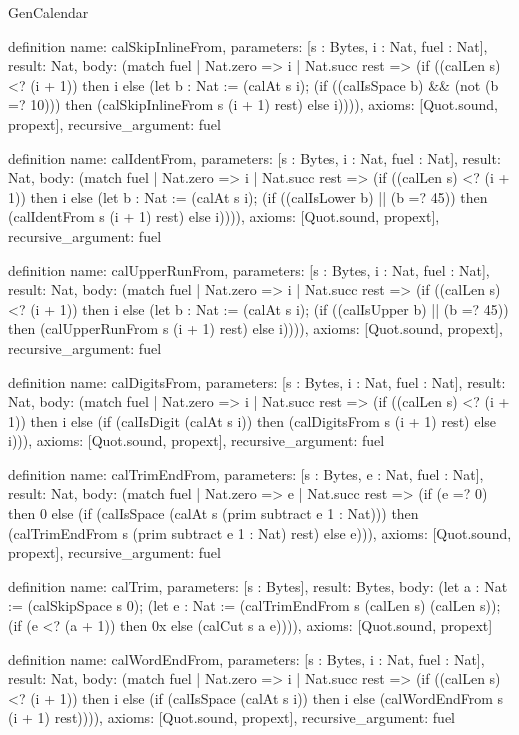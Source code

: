 \begin{lexlean}{GenCalendar}
\begin{semanticmodule}
definition{
  name: calSkipInlineFrom,
  parameters: [s : Bytes, i : Nat, fuel : Nat],
  result: Nat,
  body: (match fuel
    | Nat.zero => i
    | Nat.succ rest => (if ((calLen s) <? (i + 1)) then i else (let b : Nat := (calAt s i); (if ((calIsSpace b) && (not (b =? 10))) then (calSkipInlineFrom s (i + 1) rest) else i)))),
  axioms: [Quot.sound, propext],
  recursive_argument: fuel
}

definition{
  name: calIdentFrom,
  parameters: [s : Bytes, i : Nat, fuel : Nat],
  result: Nat,
  body: (match fuel
    | Nat.zero => i
    | Nat.succ rest => (if ((calLen s) <? (i + 1)) then i else (let b : Nat := (calAt s i); (if ((calIsLower b) || (b =? 45)) then (calIdentFrom s (i + 1) rest) else i)))),
  axioms: [Quot.sound, propext],
  recursive_argument: fuel
}

definition{
  name: calUpperRunFrom,
  parameters: [s : Bytes, i : Nat, fuel : Nat],
  result: Nat,
  body: (match fuel
    | Nat.zero => i
    | Nat.succ rest => (if ((calLen s) <? (i + 1)) then i else (let b : Nat := (calAt s i); (if ((calIsUpper b) || (b =? 45)) then (calUpperRunFrom s (i + 1) rest) else i)))),
  axioms: [Quot.sound, propext],
  recursive_argument: fuel
}

definition{
  name: calDigitsFrom,
  parameters: [s : Bytes, i : Nat, fuel : Nat],
  result: Nat,
  body: (match fuel
    | Nat.zero => i
    | Nat.succ rest => (if ((calLen s) <? (i + 1)) then i else (if (calIsDigit (calAt s i)) then (calDigitsFrom s (i + 1) rest) else i))),
  axioms: [Quot.sound, propext],
  recursive_argument: fuel
}

definition{
  name: calTrimEndFrom,
  parameters: [s : Bytes, e : Nat, fuel : Nat],
  result: Nat,
  body: (match fuel
    | Nat.zero => e
    | Nat.succ rest => (if (e =? 0) then 0 else (if (calIsSpace (calAt s (prim subtract e 1 : Nat))) then (calTrimEndFrom s (prim subtract e 1 : Nat) rest) else e))),
  axioms: [Quot.sound, propext],
  recursive_argument: fuel
}

definition{
  name: calTrim,
  parameters: [s : Bytes],
  result: Bytes,
  body: (let a : Nat := (calSkipSpace s 0); (let e : Nat := (calTrimEndFrom s (calLen s) (calLen s)); (if (e <? (a + 1)) then 0x else (calCut s a e)))),
  axioms: [Quot.sound, propext]
}

definition{
  name: calWordEndFrom,
  parameters: [s : Bytes, i : Nat, fuel : Nat],
  result: Nat,
  body: (match fuel
    | Nat.zero => i
    | Nat.succ rest => (if ((calLen s) <? (i + 1)) then i else (if (calIsSpace (calAt s i)) then i else (calWordEndFrom s (i + 1) rest)))),
  axioms: [Quot.sound, propext],
  recursive_argument: fuel
}


\end{semanticmodule}
\end{lexlean}
